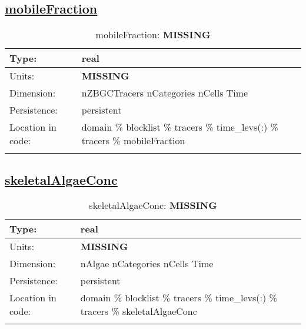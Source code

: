 \subsection[mobileFraction]{\hyperref[sec:var_tab_tracers]{mobileFraction}}
\label{subsec:var_sec_tracers_mobileFraction}
\begin{center}
\begin{longtable}{| p{2.0in} | p{4.0in} |}
        \hline 
        Type: & real \\
        \hline 
        Units: & {\bf \color{red} MISSING} \\
        \hline 
        Dimension: & nZBGCTracers nCategories nCells Time \\
        \hline 
        Persistence: & persistent \\
        \hline 
         Location in code: & domain \% blocklist \% tracers \% time\_levs(:) \% tracers \% mobileFraction \\
         \hline 
    \caption{mobileFraction: {\bf \color{red} MISSING}}
\end{longtable}
\end{center}
\subsection[skeletalAlgaeConc]{\hyperref[sec:var_tab_tracers]{skeletalAlgaeConc}}
\label{subsec:var_sec_tracers_skeletalAlgaeConc}
\begin{center}
\begin{longtable}{| p{2.0in} | p{4.0in} |}
        \hline 
        Type: & real \\
        \hline 
        Units: & {\bf \color{red} MISSING} \\
        \hline 
        Dimension: & nAlgae nCategories nCells Time \\
        \hline 
        Persistence: & persistent \\
        \hline 
         Location in code: & domain \% blocklist \% tracers \% time\_levs(:) \% tracers \% skeletalAlgaeConc \\
         \hline 
    \caption{skeletalAlgaeConc: {\bf \color{red} MISSING}}
\end{longtable}
\end{center}
